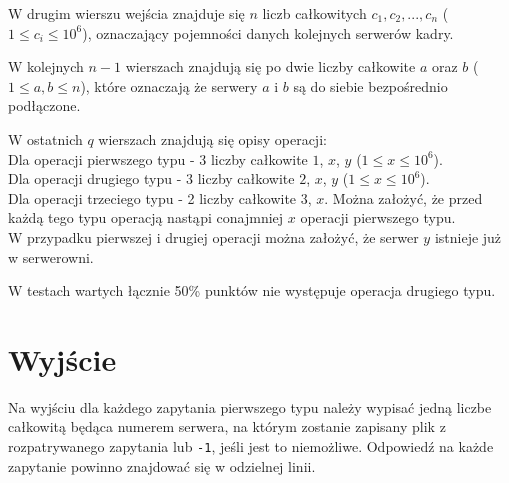 \documentclass[zad,zawodnik,utf8]{sinol}
\begin{document}
\begin{tasktext}
W drugim wierszu wejścia znajduje się $n$ liczb całkowitych $c_1, c_2, ..., c_n$ ($1 \leq c_i \leq 10^6$), oznaczający pojemności danych kolejnych serwerów kadry.

W kolejnych $n-1$ wierszach znajdują się po dwie liczby całkowite $a$ oraz $b$ ($1 \leq a, b \leq n$), które oznaczają że serwery $a$ i $b$ są do siebie bezpośrednio podłączone.

W ostatnich $q$ wierszach znajdują się opisy operacji:
\\Dla operacji pierwszego typu - 3 liczby całkowite $1$, $x$, $y$ ($1 \leq x \leq 10^6$).
\\Dla operacji drugiego typu - 3 liczby całkowite $2$, $x$, $y$ ($1 \leq x \leq 10^6$).
\\Dla operacji trzeciego typu - 2 liczby całkowite  $3$, $x$. Można założyć, że przed każdą tego typu operacją nastąpi conajmniej $x$ operacji pierwszego typu.
\\W przypadku pierwszej i drugiej operacji można założyć, że serwer $y$ istnieje już w serwerowni.

W testach wartych łącznie 50\% punktów nie występuje operacja drugiego typu.

  \section{Wyjście}
Na wyjściu dla każdego zapytania pierwszego typu należy wypisać jedną liczbe całkowitą będąca numerem serwera, na którym zostanie zapisany plik z rozpatrywanego zapytania lub \texttt{-1}, jeśli jest to niemożliwe. Odpowiedź na każde zapytanie powinno znajdować się w odzielnej linii.
\makecompactexample 

\end{tasktext}
\end{document}
